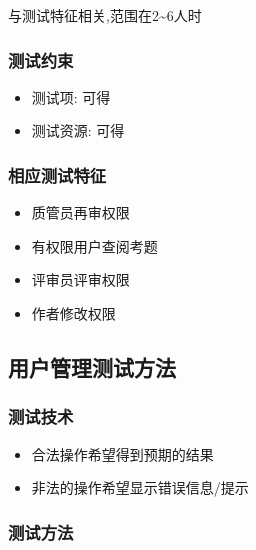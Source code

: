 \documentclass[hyperref, a4paper]{ctexart}
\providecommand{\tightlist}{%
  \setlength{\itemsep}{0pt}\setlength{\parskip}{0pt}}
\begin{document}
与测试特征相关,范围在2\textasciitilde6人时

\hypertarget{ux6d4bux8bd5ux7ea6ux675f-1}{%
\subsubsection{测试约束}\label{ux6d4bux8bd5ux7ea6ux675f-1}}

\begin{itemize}
\tightlist
\item
  测试项: 可得
\item
  测试资源: 可得
\end{itemize}

\hypertarget{ux76f8ux5e94ux6d4bux8bd5ux7279ux5f81-1}{%
\subsubsection{相应测试特征}\label{ux76f8ux5e94ux6d4bux8bd5ux7279ux5f81-1}}

\begin{itemize}
\tightlist
\item
  质管员再审权限
\item
  有权限用户查阅考题
\item
  评审员评审权限
\item
  作者修改权限
\end{itemize}

\hypertarget{ux7528ux6237ux7ba1ux7406ux6d4bux8bd5ux65b9ux6cd5}{%
\subsection{用户管理测试方法}\label{ux7528ux6237ux7ba1ux7406ux6d4bux8bd5ux65b9ux6cd5}}

\hypertarget{ux6d4bux8bd5ux6280ux672f-2}{%
\subsubsection{测试技术}\label{ux6d4bux8bd5ux6280ux672f-2}}

\begin{itemize}
\tightlist
\item
  合法操作希望得到预期的结果
\item
  非法的操作希望显示错误信息/提示
\end{itemize}

\hypertarget{ux6d4bux8bd5ux65b9ux6cd5-2}{%
\subsubsection{测试方法}\label{ux6d4bux8bd5ux65b9ux6cd5-2}}
\end{document}
